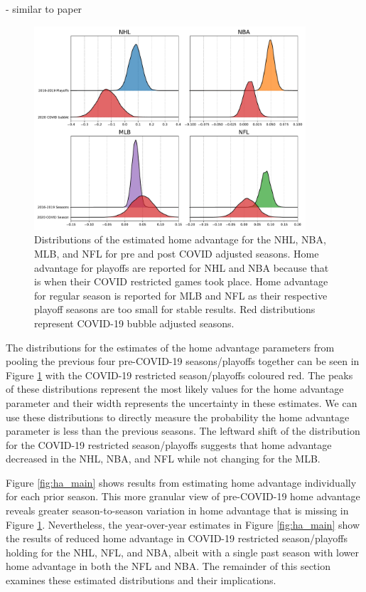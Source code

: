 - similar to paper

\begin{figure}
	\centering
	\includegraphics[width=0.9\textwidth]{figures/Figure_1.pdf}
	\caption{Distributions of the estimated home advantage for the NHL, NBA, MLB, and NFL for pre and post COVID adjusted seasons. Home advantage for playoffs are reported for NHL and NBA because that is when their COVID restricted games took place. Home advantage for regular season is reported for MLB and NFL as their respective playoff seasons are too small for stable results. Red distributions represent COVID-19 bubble adjusted seasons.}
	\label{fig:ha_pooled}
\end{figure}

The distributions for the estimates of the home advantage parameters from pooling the previous four pre-COVID-19 seasons/playoffs together can be seen in Figure \mbox{\ref{fig:ha_pooled}} with the COVID-19 restricted season/playoffs coloured red. The peaks of these distributions represent the most likely values for the home advantage parameter and their width represents the uncertainty in these estimates. We can use these distributions to directly measure the probability the home advantage parameter is less than the previous seasons. The leftward shift of the distribution for the COVID-19 restricted season/playoffs suggests that home advantage decreased in the NHL, NBA, and NFL while not changing for the MLB.

Figure \mbox{\ref{fig:ha_main}} shows results from estimating home advantage individually for each prior season. This more granular view of pre-COVID-19 home advantage reveals greater season-to-season variation in home advantage that is missing in Figure \mbox{\ref{fig:ha_pooled}}. Nevertheless, the year-over-year estimates in Figure \mbox{\ref{fig:ha_main}} show the results of reduced home advantage in COVID-19 restricted season/playoffs holding for the NHL, NFL, and NBA, albeit with a single past season with lower home advantage in both the NFL and NBA. The remainder of this section examines these estimated distributions and their implications.

